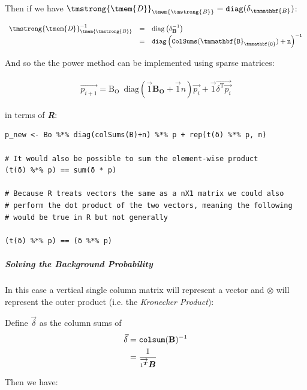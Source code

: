 \documentclass[11pt]{article}
\begin{document}
Then if we have \(\mathit{{\tmstrong{{\tmem{D}}}}}_{\mathit{{\tmem{{\tmstrong{B}}}}}} =
\mathtt{diag} (\delta_{\tmmathbf{B}}) \mathtt{}\):


\[ \begin{array}{lll}
     \mathit{{\tmstrong{{\tmem{D}}}}}_{\mathit{{\tmem{{\tmstrong{B}}}}}}^{- 1}
     & = & \mathrm{diag} \left( \delta^{- 1}_{\mathbf{B}} \right)\\
     & = & \mathtt{diag} \left( \mathtt{ColSums}
     (\mathtt{\tmmathbf{B}_{\tmmathbf{O}}}) + \mathtt{n}
     \right)^{\mathtt{- 1}}
   \end{array} \]

And so the the power method can be implemented using sparse matrices:

\begin{align}
\vec{p_{i+1}} = \mathrm{B_{O}} \enspace \mathrm{diag}\left( \vec{1} \mathbf{B_{O}} + \vec{1}n \right) \vec{p_{i}} + \vec{1} \vec{\delta^{\mathrm{T}}\vec{p_{i}}}
\end{align}

in terms of \textbf{\emph{R}}:

\begin{verbatim}
p_new <- Bo %*% diag(colSums(B)+n) %*% p + rep(t(δ) %*% p, n)

# It would also be possible to sum the element-wise product
(t(δ) %*% p) == sum(δ * p)

# Because R treats vectors the same as a nX1 matrix we could also
# perform the dot product of the two vectors, meaning the following
# would be true in R but not generally

(t(δ) %*% p) == (δ %*% p)
\end{verbatim}


\subparagraph{Solving the Background Probability}
\label{sec:org3926316}
In this case a vertical single column matrix will represent a vector and \(\otimes\) will represent the outer product (i.e. the \emph{Kronecker Product}):



Define \(\vec{\delta}\) as the column sums of
\[\begin{aligned}
     \vec{\delta} & = \mathtt{colsum} (\text{{\bfseries{B}}})^{- 1}\\
     & = \frac{1}{\overrightarrow{1^{{\scriptsize \ensuremath{\boldsymbol{T}}}}}
     \ensuremath{\boldsymbol{B}}}
   \end{aligned}\]


Then we have:
\end{document}
